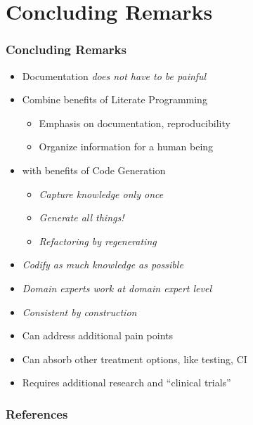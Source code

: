 \documentclass[usenames,dvipsnames]{beamer}
\begin{document}
  
\section[Conclusion]{Concluding Remarks}


\begin{frame}
  
  \frametitle{Concluding Remarks}
  
  \begin{itemize}
  \item Documentation \emph{does not have to be painful}
  \item Combine benefits of Literate Programming
  \begin{itemize}
    \item Emphasis on documentation, reproducibility
    \item Organize information for a human being
  \end{itemize}
  \item with benefits of Code Generation
  \begin{itemize}
    \item \emph{Capture knowledge only once}
    \item \emph{Generate all things!}
    \item \emph{Refactoring by regenerating}
  \end{itemize}
  \item \emph{Codify as much knowledge as possible}
  \item \emph{Domain experts work at domain expert level}
  \item \emph{Consistent by construction}
  \item Can address additional pain points
  \item Can absorb other treatment options, like testing, CI
  \item Requires additional research and ``clinical trials''
  \end{itemize}
  
\end{frame}
    
  
\begin{frame}[allowframebreaks]
\frametitle{References}


\end{frame}
\end{document}
